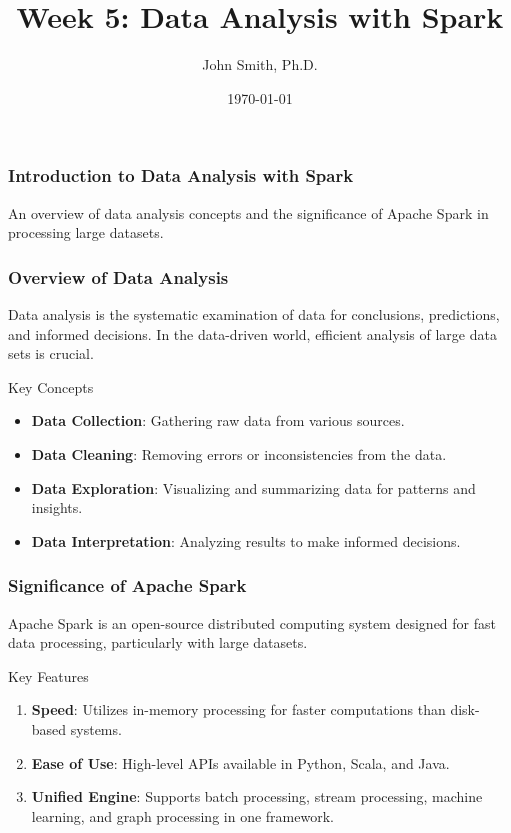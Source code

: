 \documentclass[aspectratio=169]{beamer}
\title[Data Analysis with Spark]{Week 5: Data Analysis with Spark}
\author[J. Smith]{John Smith, Ph.D.}
\institute[University Name]{
  Department of Computer Science\\
  University Name\\
  \vspace{0.3cm}
  Email: email@university.edu\\
  Website: www.university.edu
}
\date{\today}
\begin{document}
\frame{\titlepage}

\begin{frame}[fragile]
    \frametitle{Introduction to Data Analysis with Spark}
    An overview of data analysis concepts and the significance of Apache Spark in processing large datasets.
\end{frame}

\begin{frame}[fragile]
    \frametitle{Overview of Data Analysis}
    Data analysis is the systematic examination of data for conclusions, predictions, and informed decisions. In the data-driven world, efficient analysis of large data sets is crucial.

    \begin{block}{Key Concepts}
        \begin{itemize}
            \item \textbf{Data Collection}: Gathering raw data from various sources.
            \item \textbf{Data Cleaning}: Removing errors or inconsistencies from the data.
            \item \textbf{Data Exploration}: Visualizing and summarizing data for patterns and insights.
            \item \textbf{Data Interpretation}: Analyzing results to make informed decisions.
        \end{itemize}
    \end{block}
\end{frame}

\begin{frame}[fragile]
    \frametitle{Significance of Apache Spark}
    Apache Spark is an open-source distributed computing system designed for fast data processing, particularly with large datasets.

    \begin{block}{Key Features}
        \begin{enumerate}
            \item \textbf{Speed}: Utilizes in-memory processing for faster computations than disk-based systems.
            \item \textbf{Ease of Use}: High-level APIs available in Python, Scala, and Java.
            \item \textbf{Unified Engine}: Supports batch processing, stream processing, machine learning, and graph processing in one framework.
        \end{enumerate}
    \end{block}
\end{frame}
\end{document}
